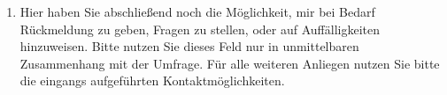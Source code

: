 \begin{enumerate}[resume]
\item Hier haben Sie abschließend noch die Möglichkeit, mir bei Bedarf Rückmeldung zu geben, Fragen zu stellen, oder auf Auffälligkeiten hinzuweisen. Bitte nutzen Sie dieses Feld nur in unmittelbaren Zusammenhang mit der Umfrage. Für alle weiteren Anliegen nutzen Sie bitte die eingangs aufgeführten Kontaktmöglichkeiten.\\
		\underline{\hspace{7.5cm}}\\ 
       \underline{\hspace{7.5cm}}\\   
       \underline{\hspace{7.5cm}}\\   
       \underline{\hspace{7.5cm}}\\
\end{enumerate}
